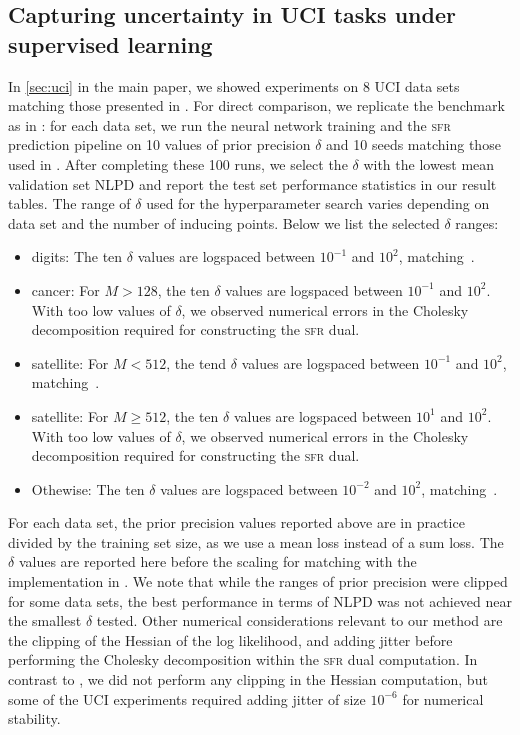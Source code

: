 \documentclass{article} %
\newcommand{\our}{\textsc{sfr}\xspace}
\begin{document}
\subsection{Capturing uncertainty in UCI tasks under supervised learning}
\label{app:uci}
%
In \cref{sec:uci} in the main paper, we showed experiments on 8 UCI data sets \cite{UCI} matching those presented in \cite{immer2021improving}. For direct comparison, we replicate the benchmark as in \cite{immer2021improving}: for each data set, we run the neural network training and the \our prediction pipeline on 10 values of prior precision $\delta$ and 10 seeds matching those used in \cite{immer2021improving}. After completing these 100 runs, we select the $\delta$ with the lowest mean validation set NLPD and report the test set performance statistics in our result tables. The range of $\delta$ used for the hyperparameter search varies depending on data set and the number of inducing points. Below we list the selected $\delta$ ranges:
\begin{itemize}
\item {\sc digits}: The ten $\delta$ values are logspaced between $10^{-1}$ and $10^2$, matching~\cite{immer2021improving}.
\item {\sc cancer}: For $M > 128$, the ten $\delta$ values are logspaced between $10^{-1}$ and $10^2$. With too low values of $\delta$, we observed numerical errors in the Cholesky decomposition required for constructing the \our dual.
\item {\sc satellite}: For $M < 512$, the tend $\delta$ values are logspaced between $10^{-1}$ and $10^2$, matching~\cite{immer2021improving}.
\item {\sc satellite}: For $M \geq 512$, the ten $\delta$ values are logspaced between $10^{1}$ and $10^2$.  With too low values of $\delta$, we observed numerical errors in the Cholesky decomposition required for constructing the \our dual.
\item Othewise: The ten $\delta$ values are logspaced between $10^{-2}$ and $10^2$, matching~\cite{immer2021improving}.
\end{itemize}

For each data set, the prior precision values reported above are in practice divided by the training set size, as we use a mean loss instead of a sum loss. The $\delta$ values are reported here before the scaling for matching with the implementation in \cite{immer2021improving}.
We note that while the ranges of prior precision were clipped for some data sets, the best performance in terms of NLPD was not achieved near the smallest $\delta$ tested. Other numerical considerations relevant to our method are the clipping of the Hessian of the log likelihood, and adding jitter before performing the Cholesky decomposition within the \our dual computation. In contrast to \citet{immer2021improving}, we did not perform any clipping in the Hessian computation, but some of the UCI experiments required adding jitter of size $10^{-6}$ for numerical stability.
\end{document}
